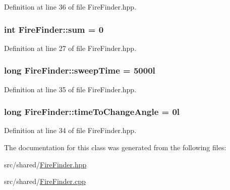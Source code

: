 Definition at line 36 of file Fire\-Finder.\-hpp.

\hypertarget{classFireFinder_a84926ae7c01b8c03bb87c810136a41ff}{
\subsubsection[{sum}]{\setlength{\rightskip}{0pt plus 5cm}int Fire\-Finder\-::sum = 0\hspace{0.3cm}{\ttfamily [private]}}}\label{classFireFinder_a84926ae7c01b8c03bb87c810136a41ff}


Definition at line 27 of file Fire\-Finder.\-hpp.

\hypertarget{classFireFinder_aaa38192d82bc4120129b72fee61f72f1}{
\subsubsection[{sweep\-Time}]{\setlength{\rightskip}{0pt plus 5cm}long Fire\-Finder\-::sweep\-Time = 5000l\hspace{0.3cm}{\ttfamily [private]}}}\label{classFireFinder_aaa38192d82bc4120129b72fee61f72f1}


Definition at line 35 of file Fire\-Finder.\-hpp.

\hypertarget{classFireFinder_a97b1a598ddb7886feb4a96a4931cc103}{
\subsubsection[{time\-To\-Change\-Angle}]{\setlength{\rightskip}{0pt plus 5cm}long Fire\-Finder\-::time\-To\-Change\-Angle = 0l\hspace{0.3cm}{\ttfamily [private]}}}\label{classFireFinder_a97b1a598ddb7886feb4a96a4931cc103}


Definition at line 34 of file Fire\-Finder.\-hpp.



The documentation for this class was generated from the following files\-:\begin{DoxyCompactItemize}
\item 
src/shared/\hyperlink{FireFinder_8hpp}{Fire\-Finder.\-hpp}\item 
src/shared/\hyperlink{FireFinder_8cpp}{Fire\-Finder.\-cpp}\end{DoxyCompactItemize}
